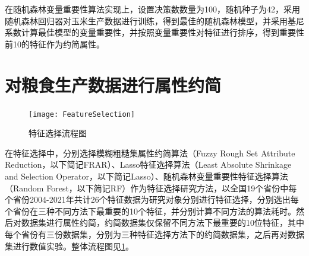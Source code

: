在随机森林变量重要性算法实现上，设置决策数数量为100，随机种子为42，采用随机森林回归器对玉米生产数据进行训练，得到最佳的随机森林模型，并采用基尼系数计算最佳模型的变量重要性，并按照变量重要性对特征进行排序，得到重要性前10的特征作为约简属性。

\section{对粮食生产数据进行属性约简}
\begin{figure}[htbp]
      \centering
      \resizebox{\textwidth}{!}
      {
      \texttt{[image: FeatureSelection]}
      }
      \caption{特征选择流程图}
      \label{fig:FeatureSelectionTime}
    \end{figure}
    在特征选择中，分别选择模糊粗糙集属性约简算法（Fuzzy Rough Set Attribute Reduction，以下简记FRAR）、Lasso特征选择算法（Least Absolute Shrinkage and Selection Operator，以下简记Lasso）、随机森林变量重要性特征选择算法（Random Forest，以下简记RF）作为特征选择研究方法，以全国19个省份中每个省份2004-2021年共计26个特征数据为研究对象分别进行特征选择，分别选出每个省份在三种不同方法下最重要的10个特征，并分别计算不同方法的算法耗时。然后对数据集进行属性约简，约简数据集仅保留不同方法下最重要的10位特征，其中每个省份有三份数据集，分别为三种特征选择方法下的约简数据集，之后再对数据集进行数值实验。整体流程图见\ref{fig:FeatureSelectionTime}。
